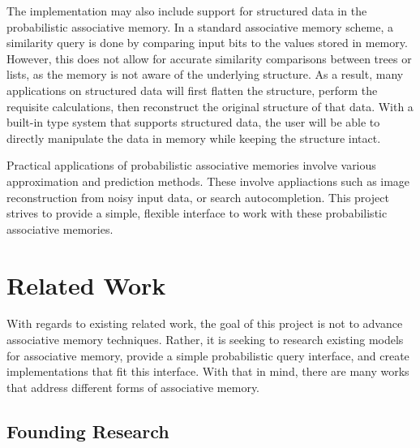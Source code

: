 \documentclass{sig-alternate}
\begin{document}

The implementation may also include support for structured data in the probabilistic associative memory.
In a standard associative memory scheme, a similarity query is done by comparing input bits
to the values stored in memory. However, this does not allow for accurate similarity comparisons
between trees or lists, as the memory is not aware of the underlying structure. As a result,
many applications on structured data will first flatten the structure, perform the requisite 
calculations, then reconstruct the original structure of that data. With a built-in type system
that supports structured data, the user will be able to directly manipulate the data in memory 
while keeping the structure intact.

Practical applications of probabilistic associative memories involve various approximation and prediction methods.
These involve appliactions such as image reconstruction from noisy input data, or search autocompletion.
This project strives to provide a simple, flexible interface to work with these probabilistic associative memories.



\section{Related Work}
\label{sec:related_work}

With regards to existing related work, the goal of this project is not to advance associative memory techniques.
Rather, it is seeking to research existing models for associative memory, provide a simple probabilistic query interface, and create 
implementations that fit this interface. With that in mind, there are many works that address different forms of associative memory. 

\subsection{Founding Research}
\label{subsec:founding}
\end{document}
